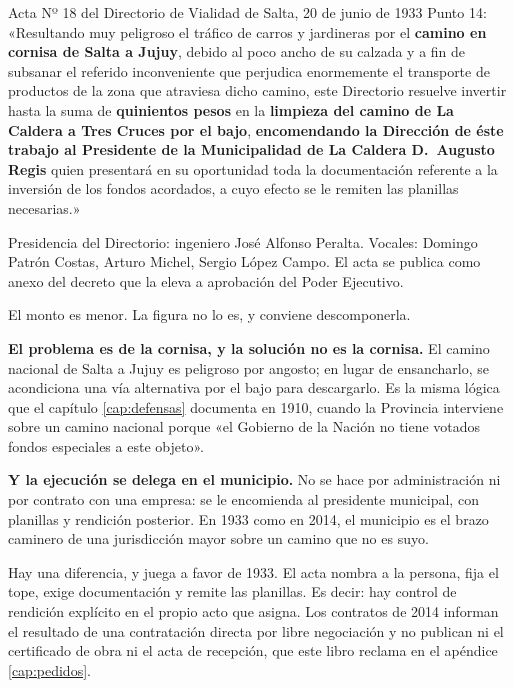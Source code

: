 \begin{ficha}{Acta Nº 18 del Directorio de Vialidad de Salta, 20 de junio de 1933}
Punto 14: «Resultando muy peligroso el tráfico de carros y jardineras por el \textbf{camino
en cornisa de Salta a Jujuy}, debido al poco ancho de su calzada y a fin de subsanar el
referido inconveniente que perjudica enormemente el transporte de productos de la zona que
atraviesa dicho camino, este Directorio resuelve invertir hasta la suma de \textbf{quinientos
pesos} en la \textbf{limpieza del camino de La Caldera a Tres Cruces por el bajo},
\textbf{encomendando la Dirección de éste trabajo al Presidente de la Municipalidad de La
Caldera D.\ Augusto Regis} quien presentará en su oportunidad toda la documentación
referente a la inversión de los fondos acordados, a cuyo efecto se le remiten las planillas
necesarias.»

Presidencia del Directorio: ingeniero José Alfonso Peralta. Vocales: Domingo Patrón Costas,
Arturo Michel, Sergio López Campo. El acta se publica como anexo del decreto que la eleva a
aprobación del Poder Ejecutivo.
\end{ficha}

El monto es menor. La figura no lo es, y conviene descomponerla.

\textbf{El problema es de la cornisa, y la solución no es la cornisa.} El camino nacional de
Salta a Jujuy es peligroso por angosto; en lugar de ensancharlo, se acondiciona una vía
alternativa por el bajo para descargarlo. Es la misma lógica que el capítulo \ref{cap:defensas} documenta en
1910, cuando la Provincia interviene sobre un camino nacional porque «el Gobierno de la
Nación no tiene votados fondos especiales a este objeto».

\textbf{Y la ejecución se delega en el municipio.} No se hace por administración ni por
contrato con una empresa: se le encomienda al presidente municipal, con planillas y rendición
posterior. En 1933 como en 2014, el municipio es el brazo caminero de una jurisdicción mayor
sobre un camino que no es suyo.

Hay una diferencia, y juega a favor de 1933. El acta nombra a la persona, fija el tope, exige
documentación y remite las planillas. Es decir: hay control de rendición explícito en el
propio acto que asigna. Los contratos de 2014 informan el resultado de una contratación
directa por libre negociación y no publican ni el certificado de obra ni el acta de
recepción, que este libro reclama en el apéndice \ref{cap:pedidos}.

